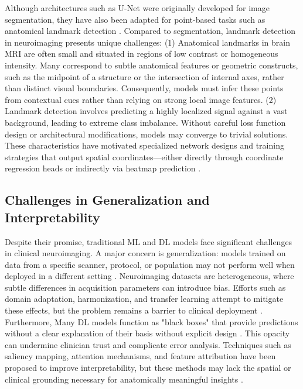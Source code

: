 Although architectures such as U-Net were originally developed for image segmentation, they have also been adapted for point-based tasks such as anatomical landmark detection \cite{Ertl2025-wu,Chong2024-rp,Ye2023-wn}. Compared to segmentation, landmark detection in neuroimaging presents unique challenges: (1) Anatomical landmarks in brain MRI are often small and situated in regions of low contrast or homogeneous intensity. Many correspond to subtle anatomical features or geometric constructs, such as the midpoint of a structure or the intersection of internal axes, rather than distinct visual boundaries. Consequently, models must infer these points from contextual cues rather than relying on strong local image features. (2) Landmark detection involves predicting a highly localized signal against a vast background, leading to extreme class imbalance. Without careful loss function design or architectural modifications, models may converge to trivial solutions. These characteristics have motivated specialized network designs and training strategies that output spatial coordinates—either directly through coordinate regression heads \cite{Nibali2018-bu} or indirectly via heatmap prediction \cite{Payer2016-ik}.

\subsection{Challenges in Generalization and Interpretability}
Despite their promise, traditional ML and DL models face significant challenges in clinical neuroimaging. A major concern is generalization: models trained on data from a specific scanner, protocol, or population may not perform well when deployed in a different setting \cite{Davatzikos2019-zq}. Neuroimaging datasets are heterogeneous, where subtle differences in acquisition parameters can introduce bias. Efforts such as domain adaptation, harmonization, and transfer learning attempt to mitigate these effects, but the problem remains a barrier to clinical deployment \cite{Iglesias2023-co}. Furthermore, Many DL models function as "black boxes" that provide predictions without a clear explanation of their basis without explicit design \cite{Holzinger2019-kw}. This opacity can undermine clinician trust and complicate error analysis. Techniques such as saliency mapping, attention mechanisms, and feature attribution have been proposed to improve interpretability, but these methods may lack the spatial or clinical grounding necessary for anatomically meaningful insights \cite{Dinsdale2022-hf}.

